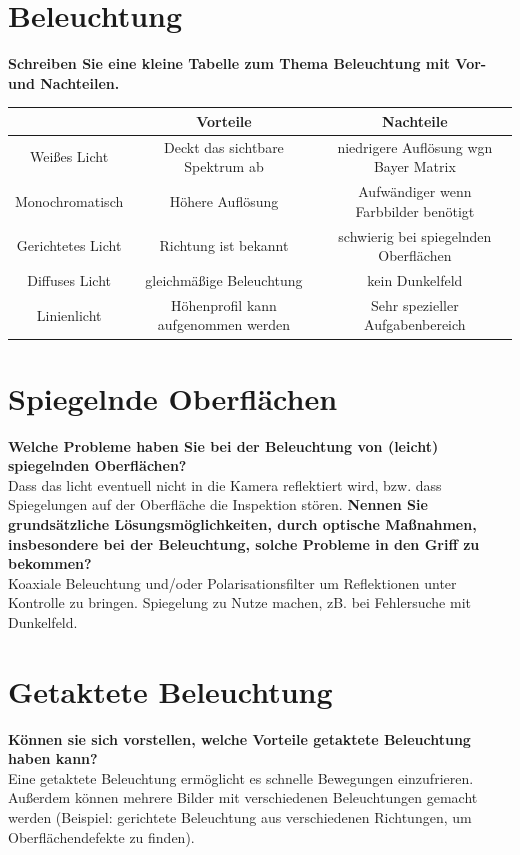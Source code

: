 \documentclass[a4paper]{article}
\begin{document}
	\section{Beleuchtung}
	\textbf{Schreiben Sie eine kleine Tabelle zum Thema Beleuchtung mit Vor- und Nachteilen.}\\
	\begin{center}
		\begin{tabular}{ c|c|c }
			& Vorteile & Nachteile \\ 
			\hline
			Weißes Licht & Deckt das sichtbare Spektrum ab & niedrigere Auflösung wgn Bayer Matrix\\
			Monochromatisch & Höhere Auflösung & Aufwändiger wenn Farbbilder benötigt \\
			\hline
			Gerichtetes Licht & Richtung ist bekannt & schwierig bei spiegelnden Oberflächen \\
			Diffuses Licht & gleichmäßige Beleuchtung & kein Dunkelfeld \\
			Linienlicht & Höhenprofil kann aufgenommen werden & Sehr spezieller Aufgabenbereich \\
		\end{tabular}
	\end{center}
	\vspace{10pt}
	
	\newpage
	
	\section{Spiegelnde Oberflächen}
	\textbf{Welche Probleme haben Sie bei der Beleuchtung von (leicht) spiegelnden Oberflächen?}\\
	Dass das licht eventuell nicht in die Kamera reflektiert wird, bzw. dass Spiegelungen auf der Oberfläche die Inspektion stören.
	\textbf{Nennen Sie grundsätzliche Lösungsmöglichkeiten, durch optische Maßnahmen, insbesondere bei der Beleuchtung, solche Probleme in den Griff zu bekommen?}\\
	Koaxiale Beleuchtung und/oder Polarisationsfilter um Reflektionen unter Kontrolle zu bringen.
	Spiegelung zu Nutze machen, zB. bei Fehlersuche mit Dunkelfeld.
	
	\section{Getaktete Beleuchtung}
	\textbf{Können sie sich vorstellen, welche Vorteile getaktete Beleuchtung haben kann?}\\
	Eine getaktete Beleuchtung ermöglicht es schnelle Bewegungen einzufrieren. Außerdem können mehrere Bilder mit verschiedenen Beleuchtungen gemacht werden (Beispiel: gerichtete Beleuchtung aus verschiedenen Richtungen, um Oberflächendefekte zu finden).

	
\end{document}
